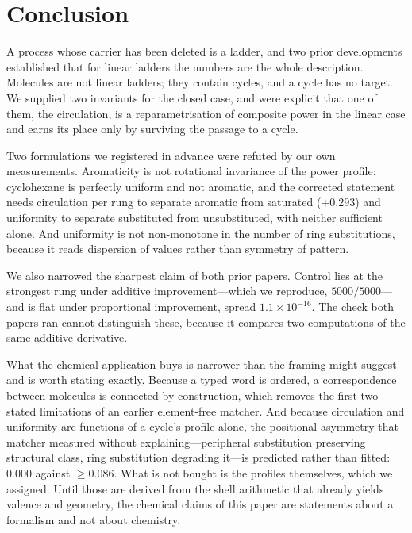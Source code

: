 \documentclass[11pt,a4paper]{article}
\theoremstyle{clthm}
\theoremstyle{definition}
\theoremstyle{remark}
\begin{document}
\section{Conclusion}
\label{sec:conclusion}

A process whose carrier has been deleted is a ladder, and two prior
developments established that for linear ladders the numbers are the whole
description. Molecules are not linear ladders; they contain cycles, and a
cycle has no target. We supplied two invariants for the closed case, and
were explicit that one of them, the circulation, is a reparametrisation of
composite power in the linear case and earns its place only by surviving
the passage to a cycle.

Two formulations we registered in advance were refuted by our own
measurements. Aromaticity is not rotational invariance of the power
profile: cyclohexane is perfectly uniform and not aromatic, and the
corrected statement needs circulation per rung to separate aromatic from
saturated ($+0.293$) and uniformity to separate substituted from
unsubstituted, with neither sufficient alone. And uniformity is not
non-monotone in the number of ring substitutions, because it reads
dispersion of values rather than symmetry of pattern.

We also narrowed the sharpest claim of both prior papers. Control lies at
the strongest rung under additive improvement---which we reproduce,
$5000/5000$---and is flat under proportional improvement, spread
$1.1\times10^{-16}$. The check both papers ran cannot distinguish these,
because it compares two computations of the same additive derivative.

What the chemical application buys is narrower than the framing might
suggest and is worth stating exactly. Because a typed word is ordered, a
correspondence between molecules is connected by construction, which
removes the first two stated limitations of an earlier element-free
matcher. And because circulation and uniformity are functions of a cycle's
profile alone, the positional asymmetry that matcher measured without
explaining---peripheral substitution preserving structural class, ring
substitution degrading it---is predicted rather than fitted: $0.000$
against $\ge0.086$. What is not bought is the profiles themselves, which
we assigned. Until those are derived from the shell arithmetic that
already yields valence and geometry, the chemical claims of this paper are
statements about a formalism and not about chemistry.
\end{document}
